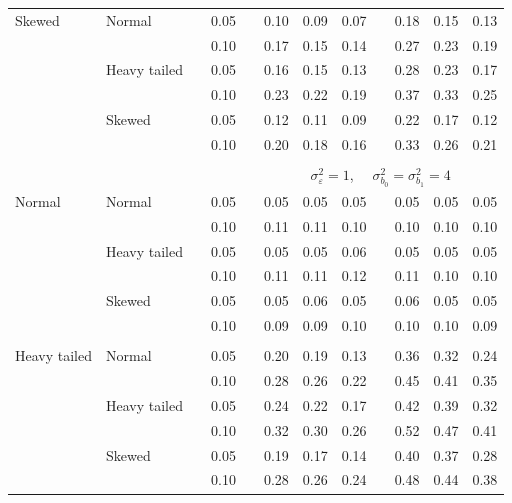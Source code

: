 \documentclass[12pt]{article} %
\begin{document}
\begin{table}[ht]
\begin{scriptsize}
\begin{center}
\begin{tabular}{ll p{.1cm} c p{.1cm} rrr p{.1cm} rrr}
Skewed       & Normal       && 0.05 &&  0.10 & 0.09 & 0.07 && 0.18 & 0.15 & 0.13 \\ 
             &              && 0.10 &&  0.17 & 0.15 & 0.14 && 0.27 & 0.23 & 0.19 \\ 
             & Heavy tailed && 0.05 &&  0.16 & 0.15 & 0.13 && 0.28 & 0.23 & 0.17 \\ 
             &              && 0.10 &&  0.23 & 0.22 & 0.19 && 0.37 & 0.33 & 0.25 \\ 
             & Skewed       && 0.05 &&  0.12 & 0.11 & 0.09 && 0.22 & 0.17 & 0.12 \\ 
             &              && 0.10 &&  0.20 & 0.18 & 0.16 && 0.33 & 0.26 & 0.21 \\ 


&&&&&&&&&&&\\
& && && \multicolumn{7}{c}{$\sigma_{\varepsilon}^2 = 1$, \ \ $\sigma_{b_0}^2 = \sigma_{b_1}^2 = 4$} \\ \cline{6-12}
\rowcolor{gray!20}Normal       & Normal       && 0.05 &&  0.05 & 0.05 & 0.05 && 0.05 & 0.05 & 0.05 \\ 
\rowcolor{gray!20}             &              && 0.10 &&  0.11 & 0.11 & 0.10 && 0.10 & 0.10 & 0.10 \\ 
\rowcolor{gray!20}             & Heavy tailed && 0.05 &&  0.05 & 0.05 & 0.06 && 0.05 & 0.05 & 0.05 \\ 
\rowcolor{gray!20}             &              && 0.10 &&  0.11 & 0.11 & 0.12 && 0.11 & 0.10 & 0.10 \\ 
\rowcolor{gray!20}             & Skewed       && 0.05 &&  0.05 & 0.06 & 0.05 && 0.06 & 0.05 & 0.05 \\ 
\rowcolor{gray!20}             &              && 0.10 &&  0.09 & 0.09 & 0.10 && 0.10 & 0.10 & 0.09 \\ 
             &&&&&&&&&&&\\
Heavy tailed & Normal       && 0.05 &&  0.20 & 0.19 & 0.13 && 0.36 & 0.32 & 0.24 \\ 
             &              && 0.10 &&  0.28 & 0.26 & 0.22 && 0.45 & 0.41 & 0.35 \\ 
             & Heavy tailed && 0.05 &&  0.24 & 0.22 & 0.17 && 0.42 & 0.39 & 0.32 \\ 
             &              && 0.10 &&  0.32 & 0.30 & 0.26 && 0.52 & 0.47 & 0.41 \\ 
             & Skewed       && 0.05 &&  0.19 & 0.17 & 0.14 && 0.40 & 0.37 & 0.28 \\ 
             &              && 0.10 &&  0.28 & 0.26 & 0.24 && 0.48 & 0.44 & 0.38 \\ 

\end{tabular}
\end{center}
\end{scriptsize}
\end{table}
\end{document}
